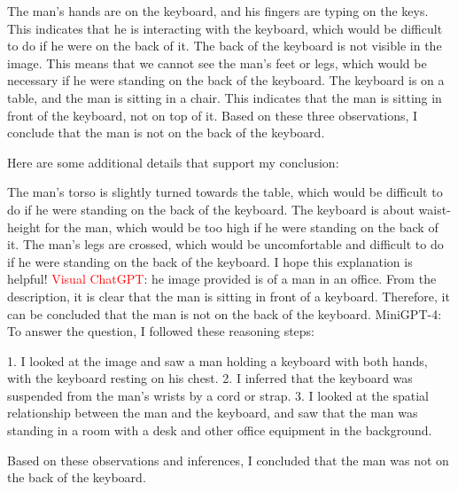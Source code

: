 \begin{enumerate}
        The man's hands are on the keyboard, and his fingers are typing on the keys. This indicates that he is interacting with the keyboard, which would be difficult to do if he were on the back of it.
        The back of the keyboard is not visible in the image. This means that we cannot see the man's feet or legs, which would be necessary if he were standing on the back of the keyboard.
        The keyboard is on a table, and the man is sitting in a chair. This indicates that the man is sitting in front of the keyboard, not on top of it.
        Based on these three observations, I conclude that the man is not on the back of the keyboard.
        
        Here are some additional details that support my conclusion:
        
        The man's torso is slightly turned towards the table, which would be difficult to do if he were standing on the back of the keyboard.
        The keyboard is about waist-height for the man, which would be too high if he were standing on the back of it.
        The man's legs are crossed, which would be uncomfortable and difficult to do if he were standing on the back of the keyboard.
        I hope this explanation is helpful!
        \subitem \textcolor{red}{Visual ChatGPT}: he image provided is of a man in an office. From the description, it is clear that the man is sitting in front of a keyboard. Therefore, it can be concluded that the man is not on the back of the keyboard.
        \subitem MiniGPT-4: To answer the question, I followed these reasoning steps:

        1. I looked at the image and saw a man holding a keyboard with both hands, with the keyboard resting on his chest.
        2. I inferred that the keyboard was suspended from the man’s wrists by a cord or strap.
        3. I looked at the spatial relationship between the man and the keyboard, and saw that the man was standing in a room with a desk and other office equipment in the background.
        
        Based on these observations and inferences, I concluded that the man was not on the back of the keyboard.
    \end{enumerate}
